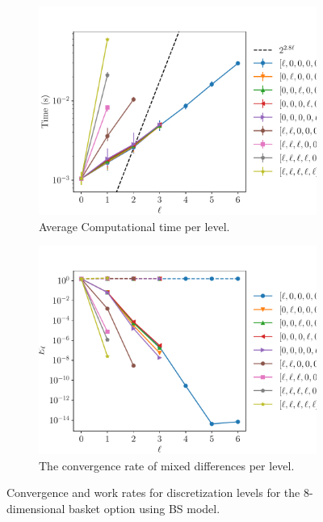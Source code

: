 \documentclass[11pt]{article}
\begin{document}
\begin{figure}[!h]
	\centering
	\begin{subfigure}{.5\textwidth}
		\centering
		\includegraphics[width=0.95\linewidth]{./figures/8D_basket/level_work.pdf}
		\caption{Average Computational time per level.}
		\label{fig:misc_8D_Basket_sub3}
	\end{subfigure}%
	\begin{subfigure}{.5\textwidth}
		\centering
		\includegraphics[width=0.95\linewidth]{./figures/8D_basket/levels_error_rate.pdf}
		\caption{The convergence rate of mixed differences per level.}
		\label{fig:misc_8D_Basket_sub4}
	\end{subfigure}%
	\caption{Convergence and work rates for discretization levels for the $8$-dimensional basket option using BS model.}
	\label{fig:misc_8D_Basket_2}
\end{figure}
\newpage
\end{document}
